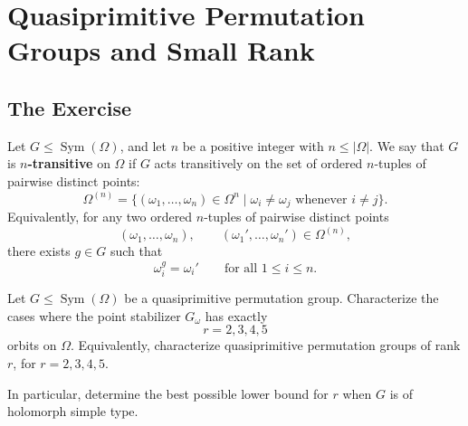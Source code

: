 
\chapter{Quasiprimitive Permutation Groups and Small Rank}

\section{The Exercise}

\begin{definition}
    Let \(G \leq \operatorname{Sym}(\Omega)\), and let \(n\) be a positive integer with
    \(n \leq |\Omega|\). We say that \(G\) is \textbf{\(n\)-transitive} on \(\Omega\) if
    \(G\) acts transitively on the set of ordered \(n\)-tuples of pairwise distinct points:
    \[
        \Omega^{(n)}
        =
        \{(\omega_1,\ldots,\omega_n)\in \Omega^n
          \mid \omega_i\neq \omega_j \text{ whenever } i\neq j\}.
    \]
    Equivalently, for any two ordered \(n\)-tuples of pairwise distinct points
    \[
        (\omega_1,\ldots,\omega_n),
        \qquad
        (\omega_1',\ldots,\omega_n')
        \in \Omega^{(n)},
    \]
    there exists \(g\in G\) such that
    \[
        \omega_i^g=\omega_i'
        \qquad
        \text{for all } 1\leq i\leq n.
    \]
    \end{definition}

\begin{exercise}
Let \(G \leq \operatorname{Sym}(\Omega)\) be a quasiprimitive permutation group.
Characterize the cases where the point stabilizer \(G_\omega\) has exactly
\[
r=2,3,4,5
\]
orbits on \(\Omega\). Equivalently, characterize quasiprimitive permutation groups
of rank \(r\), for \(r=2,3,4,5\).

In particular, determine the best possible lower bound for \(r\) when \(G\) is of
holomorph simple type.
\end{exercise}

